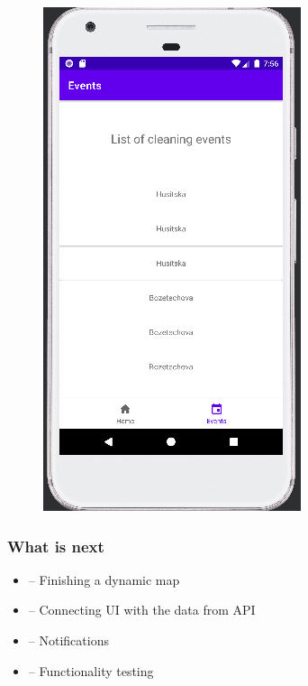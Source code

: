 \documentclass[10pt,xcolor=pdflatex,hyperref={unicode}]{beamer}
\begin{document}
\begin{frame}
\begin{figure}
\begin{minipage}{0.3\textwidth}
        \end{minipage}
        \hfill
        \begin{minipage}{0.3\textwidth}
            \centering
            \includegraphics[width=0.25\paperwidth]{img/ui3.jpg}
        \end{minipage}
        \hfill
    \end{figure}
\end{frame}


\begin{frame}\frametitle{What is next}
    \begin{itemize}
        \item[] -- Finishing a dynamic map
        \item[] -- Connecting UI with the data from API
        \item[] -- Notifications
        \item[] -- Functionality testing
    \end{itemize}
\end{frame}


\end{document}
